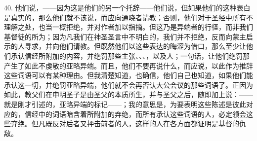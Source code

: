 40. 他们说，——因为这是他们的另一个托辞——他们说，但如果他们的这种表白是真实的，那么他们就不该说，而应向通晓者请教；否则，他们对于圣经中所有不理解之处，也当一概拒绝，并对作者加以指摘。但这乃是异端者的行径，而非我们基督徒的所为；因为凡我们在神圣圣言中不明白的，我们并不拒绝，反而向蒙主启示的人寻求，并向他们请教。但既然他们以这些表达的晦涩为借口，那么至少让他们承认信经所附加的内容，并绝罚那些主张、、、，以及人；一句话，让他们绝罚那产生了如此不虔敬的亚略异端。而且，他们不要再说什么，而应说，以此作为推辞这些词语可以有某种理由。但我清楚知道，也确信，他们自己也知道，如果他们能承认这一切，并绝罚亚略异端，他们就不会再否认大公会议的那些词语了。正因为如此，教父们在申明圣子是由圣父的本质所生，并与圣父之后，随即加上说：——就是刚才引述的，亚略异端的标记——；我的意思是，为要表明这些陈述是彼此对应的，信经中的词语暗含着所附加的弃绝，而所有承认这些词语的人，必定领会这些弃绝。但凡既反对后者又抨击前者的人，这样的人在各方面都证明是基督的仇敌。\par

